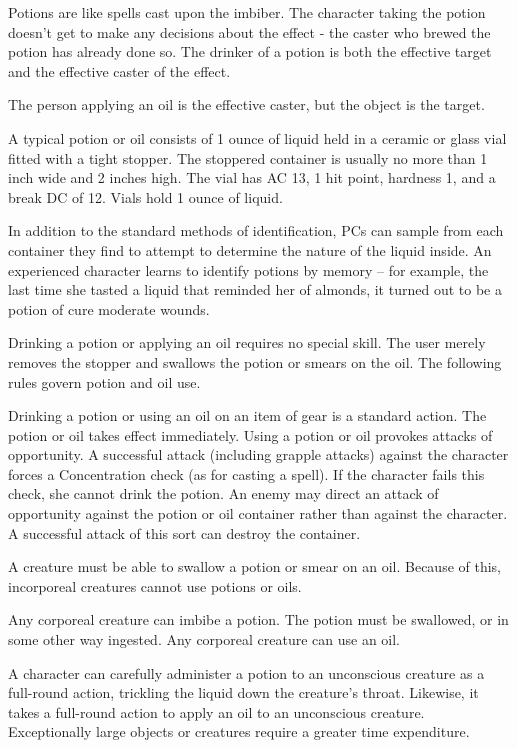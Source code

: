 Potions are like spells cast upon the imbiber. The character taking the potion doesn't get to make any decisions about the effect  - the caster who brewed the potion has already done so. The drinker of a potion is both the effective target and the effective caster of the effect.

The person applying an oil is the effective caster, but the object is the target.

 A typical potion or oil consists of 1 ounce of liquid held in a ceramic or glass vial fitted with a tight stopper. The stoppered container is usually no more than 1 inch wide and 2 inches high. The vial has AC 13, 1 hit point, hardness 1, and a break DC of 12. Vials hold 1 ounce of liquid.

 In addition to the standard methods of identification, PCs can sample from each container they find to attempt to determine the nature of the liquid inside. An experienced character learns to identify potions by memory -- for example, the last time she tasted a liquid that reminded her of almonds, it turned out to be a potion of cure moderate wounds.

 Drinking a potion or applying an oil requires no special skill. The user merely removes the stopper and swallows the potion or smears on the oil. The following rules govern potion and oil use.

Drinking a potion or using an oil on an item of gear is a standard action. The potion or oil takes effect immediately. Using a potion or oil provokes attacks of opportunity. A successful attack (including grapple attacks) against the character forces a Concentration check (as for casting a spell). If the character fails this check, she cannot drink the potion. An enemy may direct an attack of opportunity against the potion or oil container rather than against the character. A successful attack of this sort can destroy the container.

A creature must be able to swallow a potion or smear on an oil. Because of this, incorporeal creatures cannot use potions or oils.

Any corporeal creature can imbibe a potion. The potion must be swallowed, or in some other way ingested. Any corporeal creature can use an oil.

A character can carefully administer a potion to an unconscious creature as a full-round action, trickling the liquid down the creature's throat. Likewise, it takes a full-round action to apply an oil to an unconscious creature. Exceptionally large objects or creatures require a greater time expenditure.

